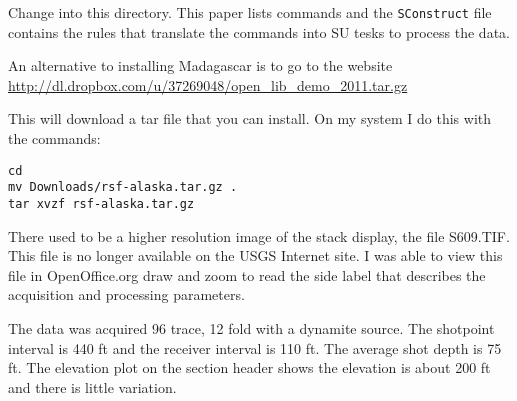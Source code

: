 Change into this directory.  This paper lists commands and the \texttt{SConstruct} 
file contains the rules that translate the commands into SU tesks 
to process the data.

An alternative to installing Madagascar is to go to the website \url{http://dl.dropbox.com/u/37269048/open_lib_demo_2011.tar.gz}

This will download a tar file that you can install.  On my system I
do this with the commands:
\begin{verbatim}
cd
mv Downloads/rsf-alaska.tar.gz .
tar xvzf rsf-alaska.tar.gz
\end{verbatim}

\begin{comment}
This will untar the directory.  When it completes, continue:\\
cd open\_lib\_demo\_2011\\
cat readme

This will tell you about the files you downloaded.  You can look at the 
su commands the process will use by typing:\\
cat doit.job

Then you can run the processing by typing:\\  
./doit.job

You can also run the individual tasks with the scripts in the tar file. 
For example, to view the previous final stack, the text says run:
\begin{verbatim}
scons prevstack.view 
\end{verbatim}

You can run the script from the tar file:
\begin{verbatim}
./prevstack.job
\end{verbatim}

The scons will download the file \texttt{31\_81\_IM.JPG} from the Internet and 
display it using open office draw (oodraw).  The tar file supplies the 
files so the scripts skip the download.  ./prevstack.job just displays
the file using oodraw.
\end{comment}

There used to be a higher resolution image of the stack display, the 
file S609.TIF.  This file is no longer available on the USGS Internet 
site.  I was able to view this file in OpenOffice.org draw 
and zoom to read the side label that describes the acquisition and 
processing parameters.

The data was acquired 96 trace, 12 fold with a dynamite source.  The
shotpoint interval is 440 ft and the receiver interval is 110 ft.  The
average shot depth is 75 ft.  The elevation plot on the section header
shows the elevation is about 200 ft and there is little variation.

